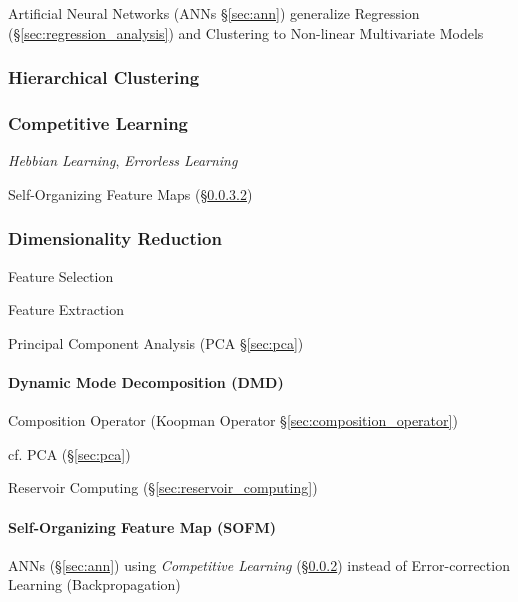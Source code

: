 Artificial Neural Networks (ANNs \S\ref{sec:ann}) generalize Regression
(\S\ref{sec:regression_analysis}) and Clustering to Non-linear Multivariate
Models



\subsubsection{Hierarchical Clustering}\label{sec:hierarchical_clustering}

\subsubsection{Competitive Learning}\label{sec:competitive_learning}

\emph{Hebbian Learning}, \emph{Errorless Learning}

Self-Organizing Feature Maps (\S\ref{sec:sofm})



\subsubsection{Dimensionality Reduction}\label{sec:dimensionality_reduction}

Feature Selection

Feature Extraction

Principal Component Analysis (PCA \S\ref{sec:pca})



\paragraph{Dynamic Mode Decomposition (DMD)}\label{sec:dmd}\hfill

Composition Operator (Koopman Operator \S\ref{sec:composition_operator})

cf. PCA (\S\ref{sec:pca})

\fist Reservoir Computing (\S\ref{sec:reservoir_computing})



\paragraph{Self-Organizing Feature Map (SOFM)}\label{sec:sofm}\hfill

ANNs (\S\ref{sec:ann}) using \emph{Competitive Learning}
(\S\ref{sec:competitive_learning}) instead of Error-correction Learning
(Backpropagation)



